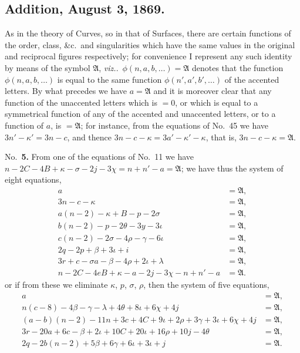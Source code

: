 \documentclass[11pt,a4paper]{article}
\theoremstyle{definition}
\newcommand{\viz}{\textit{viz.}}
\begin{document}
\subsection*{Addition, August 3, 1869.}

As in the theory of Curves, so in that of Surfaces, there are certain functions of the order, class, \&c.\ and singularities which have the same values in the original and reciprocal figures respectively; for convenience I represent any such identity by means of the symbol $\mathfrak{A}$, \viz.\ $\phi(n, a, b, \ldots) = \mathfrak{A}$ denotes that the function $\phi(n, a, b, \ldots)$ is equal to the same function $\phi(n', a', b', \ldots)$ of the accented letters. By what precedes we have $a = \mathfrak{A}$ and it is moreover clear that any function of the unaccented letters which is $= 0$, or which is equal to a symmetrical function of any of the accented and unaccented letters, or to a function of $a$, is $= \mathfrak{A}$; for instance, from the equations of No.~45 we have $3n' - \kappa' = 3n - c$, and thence $3n - c - \kappa = 3a' - \kappa' - \kappa$, that is, $3n - c - \kappa = \mathfrak{A}$.

\setcounter{page}{356}

No.~\textbf{5.} From one of the equations of No.~11 we have $n - 2C - 4B + \kappa - \sigma - 2j - 3\chi = n + n' - a = \mathfrak{A}$; we have thus the system of eight equations,
\begin{align*}
a &= \mathfrak{A}, \\
3n - c - \kappa &= \mathfrak{A}, \\
a(n-2) - \kappa + B - p - 2\sigma &= \mathfrak{A}, \\
b(n-2) - p - 2\theta - 3y - 3\iota &= \mathfrak{A}, \\
c(n-2) - 2\sigma - 4\rho - \gamma - 6\iota &= \mathfrak{A}, \\
2q - 2p + \beta + 3\iota + i &= \mathfrak{A}, \\
3r + c - \sigma a - \beta - 4\rho + 2\iota + \lambda &= \mathfrak{A}, \\
n - 2C - 4eB + \kappa - a - 2j - 3\chi - n + n' - a &= \mathfrak{A}.
\end{align*}
or if from these we eliminate $\kappa$, $p$, $\sigma$, $\rho$, then the system of five equations,
\begin{align*}
a &= \mathfrak{A}, \\
n(c - 8) - 4\beta - \gamma - \lambda + 4\theta + 8\iota + 6\chi + 4j &= \mathfrak{A}, \\
(a - b)(n - 2) - 11n + 3c + 4C + 9\iota + 2\rho + 3\gamma + 3\iota + 6\chi + 4j &= \mathfrak{A}, \\
3r - 20a + 6c - \beta + 2\iota + 10C + 20\iota + 16\rho + 10j - 4\theta &= \mathfrak{A}, \\
2q - 2b(n-2) + 5\beta + 6\gamma + 6\iota + 3\iota + j &= \mathfrak{A}.
\end{align*}
\end{document}
